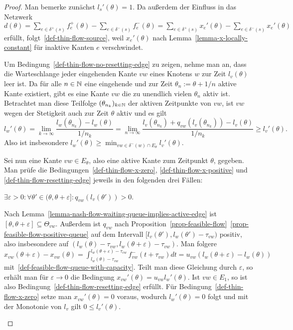 \begin{proof}
	Man bemerke zunächst $l_s'(\theta) = 1$.
	Da außerdem der Einfluss in das Netzwerk $d(\theta)=  \sum_{e\in \delta^+(s)} f_e^+(\theta) - \sum_{e\in\delta^-(s)} f_e^-(\theta) = \sum_{e\in \delta^+(s)} x_e'(\theta) - \sum_{e\in\delta^-(s)} x_e'(\theta)$ erfüllt, folgt~\ref{def-thin-flow-source}, weil $x_e'(\theta)$ nach Lemma~\ref{lemma-x-locally-constant} für inaktive Kanten $e$ verschwindet.
	
	Um Bedingung~\ref{def-thin-flow-no-resetting-edge} zu zeigen,
	nehme man an, dass die Warteschlange jeder eingehenden Kante $vw$ eines Knotens $w$ zur Zeit $l_v(\theta)$ leer ist.
	Da für alle $n\in\mathbb{N}$ eine eingehende und zur Zeit $\theta_n := \theta + 1/n$ aktive Kante existiert, gibt es eine Kante $vw$ die zu unendlich vielen $\theta_n$ aktiv ist.
	Betrachtet man diese Teilfolge $(\theta_{n_k})_{k\in\mathbb{N}}$ der aktiven Zeitpunkte von $vw$, ist $vw$ wegen der Stetigkeit auch zur Zeit $\theta$ aktiv und es gilt 
	\[
	l_w'(\theta) = \lim_{k\to\infty} \frac{l_w(\theta_{n_k})- l_w(\theta)}{1/n_k} = \lim_{n\to\infty} \frac{ l_v(\theta_{n_k}) + q_{vw}(l_v(\theta_{n_k})) - l_v(\theta) }{1/n_k} \geq l_v'(\theta).
	\]
	Also ist insbesondere $l_w'(\theta) \geq \min_{vw\in \delta^-(w)\cap E_\theta} l_v'(\theta)$.
	
	Sei nun eine Kante $vw\in E_\theta$, also eine aktive Kante zum Zeitpunkt $\theta$, gegeben. Man prüfe die Bedingungen~\ref{def-thin-flow-x-zero}, \ref{def-thin-flow-x-positive} und \ref{def-thin-flow-resetting-edge} jeweils in den folgenden drei Fällen:
	
	\begin{description}[leftmargin=0cm, topsep=0cm, itemindent=0.5cm]
		\item[1. Fall:] $\exists \varepsilon > 0:\forall \theta'\in (\theta, \theta + \varepsilon ] : q_{vw}(l_v(\theta')) > 0$.
		
		Nach Lemma~\ref{lemma-nash-flow-waiting-queue-implies-active-edge} ist $[\theta,\theta+\varepsilon]\subseteq \Theta_{vw}$.
		Außerdem ist $q_{vw}$ nach Proposition~\ref{prop-feasible-flow}~\ref{prop-feasible-flow-positive-queue} auf dem Intervall $[ l_v(\theta') , l_w(\theta') - \tau_{vw} )$ positiv, also insbesondere auf $( l_w(\theta)-\tau_{vw} , l_w(\theta + \varepsilon) - \tau_{vw} )$.
		Man folgere $x_{vw}(\theta + \varepsilon) - x_{vw}(\theta) = \int_{l_w(\theta)-\tau_{vw}}^{l_w(\theta + \varepsilon)-\tau_{vw}} f_{vw}^-(t+\tau_{vw}) dt
		= u_{vw} (l_w(\theta + \varepsilon) - l_w(\theta))$ mit~\ref{def-feasible-flow-queue-with-capacity}.
		Teilt man diese Gleichung durch $\varepsilon$, so erhält man für $\varepsilon\rightarrow 0$ die Bedingung $x_{vw}'(\theta) = u_{vw} l_w'(\theta)$.
		Ist $vw\in E_1$, so ist also Bedingung~\ref{def-thin-flow-resetting-edge} erfüllt.
		Für Bedingung~\ref{def-thin-flow-x-zero} setze man $x_{vw}'(\theta)=0$ voraus, wodurch $l_w'(\theta)=0$ folgt und mit der Monotonie von $l_v$ gilt $0 \leq l_v'(\theta)$.


\end{description}
\end{proof}
